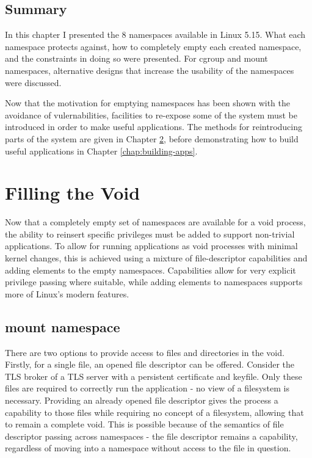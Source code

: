 \documentclass[12pt,a4paper,twoside]{report}
\begin{document}
\section{Summary}

In this chapter I presented the 8 namespaces available in Linux 5.15. What each namespace protects against, how to completely empty each created namespace, and the constraints in doing so were presented. For cgroup and mount namespaces, alternative designs that increase the usability of the namespaces were discussed.

Now that the motivation for emptying namespaces has been shown with the avoidance of vulernabilities, facilities to re-expose some of the system must be introduced in order to make useful applications. The methods for reintroducing parts of the system are given in Chapter \ref{chap:filling-the-void}, before demonstrating how to build useful applications in Chapter \ref{chap:building-apps}.


\chapter{Filling the Void}
\label{chap:filling-the-void}

Now that a completely empty set of namespaces are available for a void process, the ability to reinsert specific privileges must be added to support non-trivial applications. To allow for running applications as void processes with minimal kernel changes, this is achieved using a mixture of file-descriptor capabilities and adding elements to the empty namespaces. Capabilities allow for very explicit privilege passing where suitable, while adding elements to namespaces supports more of Linux's modern features.

\section{mount namespace}
\label{sec:filling-mount}

There are two options to provide access to files and directories in the void. Firstly, for a single file, an opened file descriptor can be offered. Consider the TLS broker of a TLS server with a persistent certificate and keyfile. Only these files are required to correctly run the application - no view of a filesystem is necessary. Providing an already opened file descriptor gives the process a capability to those files while requiring no concept of a filesystem, allowing that to remain a complete void. This is possible because of the semantics of file descriptor passing across namespaces - the file descriptor remains a capability, regardless of moving into a namespace without access to the file in question.
\end{document}
